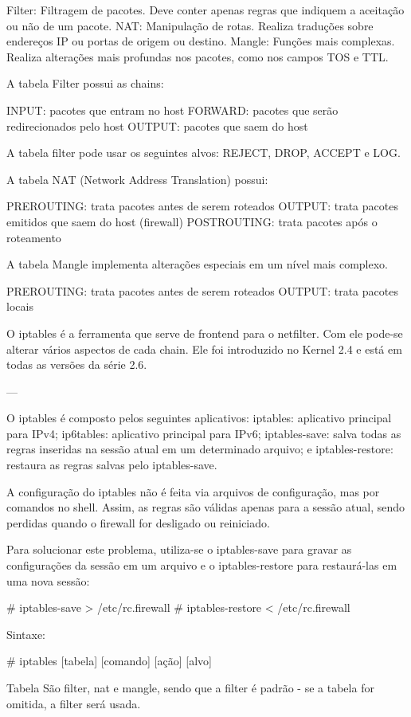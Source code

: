 Filter: Filtragem de pacotes. Deve conter apenas regras que indiquem a aceitação ou não de um pacote.
NAT: Manipulação de rotas. Realiza traduções sobre endereços IP ou portas de origem ou destino.
Mangle: Funções mais complexas. Realiza alterações mais profundas nos pacotes, como nos campos TOS e TTL.

A tabela Filter possui as chains:

INPUT: pacotes que entram no host
FORWARD: pacotes que serão redirecionados pelo host
OUTPUT: pacotes que saem do host

A tabela filter pode usar os seguintes alvos: REJECT, DROP, ACCEPT e LOG.

A tabela NAT (Network Address Translation) possui:

PREROUTING: trata pacotes antes de serem roteados
OUTPUT: trata pacotes emitidos que saem do host (firewall)
POSTROUTING: trata pacotes após o roteamento

A tabela Mangle implementa alterações especiais em um nível mais complexo.

PREROUTING: trata pacotes antes de serem roteados
OUTPUT: trata pacotes locais

O iptables é a ferramenta que serve de frontend para o netfilter. Com ele pode-se alterar vários aspectos de cada chain. Ele foi introduzido no Kernel 2.4 e está em todas as versões da série 2.6.

---

O iptables é composto pelos seguintes aplicativos:
iptables: aplicativo principal para IPv4;
ip6tables: aplicativo principal para IPv6;
iptables-save: salva todas as regras inseridas na sessão atual em um determinado arquivo; e
iptables-restore: restaura as regras salvas pelo iptables-save.

A configuração do iptables não é feita via arquivos de configuração, mas por comandos no shell. Assim, as regras são válidas apenas para a sessão atual, sendo perdidas quando o firewall for desligado ou reiniciado.

Para solucionar este problema, utiliza-se o iptables-save para gravar as configurações da sessão em um arquivo e o iptables-restore para restaurá-las em uma nova sessão:

# iptables-save > /etc/rc.firewall
# iptables-restore < /etc/rc.firewall

Sintaxe:

# iptables [tabela] [comando] [ação] [alvo]

Tabela
São filter, nat e mangle, sendo que a filter é padrão - se a tabela for omitida, a filter será usada.

